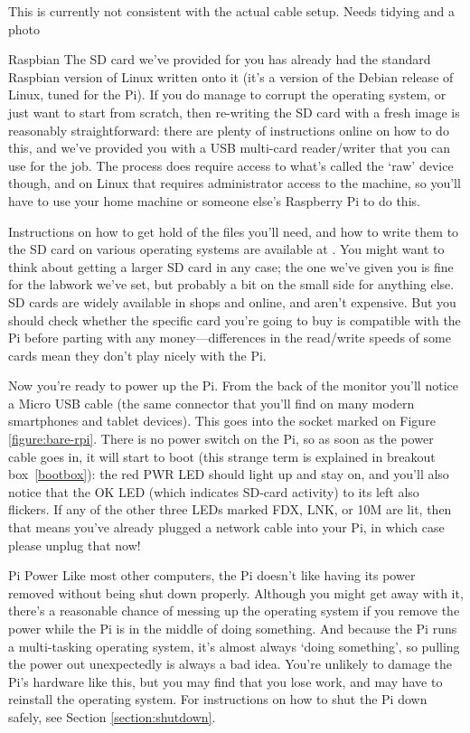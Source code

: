 \begin{note}
This is currently not consistent with the actual cable setup. Needs tidying and a photo
\end{note}

\begin{rpi}{Raspbian}
  The SD card we've provided for you has already had the standard Raspbian version of Linux written onto it (it's a version of the Debian release of Linux, tuned for the Pi). If you do manage to corrupt the operating system, or just want to start from scratch, then re-writing the SD card with a fresh image is reasonably straightforward: there are plenty of instructions online on how to do this, and we've provided you with a USB multi-card reader/writer that you can use for the job. The process does require access to what's called the `raw' device though, and on Linux that requires administrator access to the machine, so you'll have to use your home machine or someone else's Raspberry Pi to do this.

  Instructions on how to get hold of the files you'll need, and how to write them to the SD card on various operating systems are available at . You might want to think about getting a larger SD card in any case; the one we've given you is fine for the labwork we've set, but probably a bit on the small side for anything else. SD cards are widely available in shops and online, and aren't expensive. But you should check whether the specific card you're going to buy is compatible with the Pi before parting with any money---differences in the read/write speeds of some cards mean they don't play nicely with the Pi.
\end{rpi}

Now you're ready to power up the Pi. From the back of the monitor you'll notice a Micro USB cable (the same connector that you'll find on many modern smartphones and tablet devices). This goes into the socket marked  on Figure \ref{figure:bare-rpi}. There is no power switch on the Pi, so as soon as the power cable goes in, it will start to boot (this strange term is explained in breakout box~\ref{bootbox}): the red PWR LED should light up and stay on, and you'll also notice that the OK LED (which indicates SD-card activity) to its left also flickers. If any of the other three LEDs marked FDX, LNK, or 10M are lit, then that means you've already plugged a network cable into your Pi, in which case please unplug that now!

\begin{danger}{Pi Power} 
Like most other computers, the Pi doesn't like having its power removed without being shut down properly. Although you might get away with it, there's a reasonable chance of messing up the operating system if you remove the power while the Pi is in the middle of doing something. And because the Pi runs a multi-tasking operating system, it's almost always `doing something', so pulling the power out unexpectedly is always a bad idea. You're unlikely to damage the Pi's hardware like this, but you may find that you lose work, and may have to reinstall the operating system. For instructions on how to shut the Pi down safely, see Section \ref{section:shutdown}.
\end{danger}

